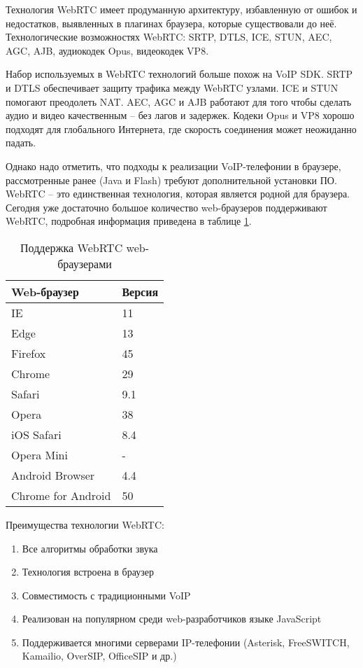 Технология WebRTC имеет продуманную архитектуру, избавленную от ошибок и недостатков, выявленных в плагинах браузера, которые существовали до неё. Технологические возможностях WebRTC: SRTP, DTLS, ICE, STUN, AEC, AGC, AJB, аудиокодек Opus, видеокодек VP8.

Набор используемых в WebRTC технологий больше похож на VoIP SDK. SRTP и DTLS обеспечивает защиту трафика между WebRTC узлами. ICE и STUN помогают преодолеть NAT.\cite{sip_nat} AEC, AGC и AJB работают для того чтобы сделать аудио и видео качественным – без лагов и задержек. Кодеки Opus и VP8 хорошо подходят для глобального Интернета, где скорость соединения может неожиданно падать.

Однако надо отметить, что подходы к реализации VoIP-телефонии в браузере, рассмотренные ранее (Java и Flash) требуют дополнительной установки ПО. WebRTC – это единственная технология, которая является родной для браузера. Сегодня уже достаточно большое количество web-браузеров поддерживают WebRTC, подробная информация приведена в таблице \ref{table:browsers}.\cite{browsers_url}

\begin{table}
    \caption{Поддержка WebRTC web-браузерами}
    \begin{center}
    \begin{tabular}{|l|l|}
    \hline
    \textbf{Web-браузер} & \textbf{Версия}\\
    \hline
    IE & 11 \\
    \hline
    Edge & 13 \\
    \hline
    Firefox & 45 \\
    \hline
    Chrome & 29 \\
    \hline
    Safari & 9.1 \\
    \hline
    Opera & 38 \\
    \hline
    iOS Safari & 8.4 \\
    \hline
    Opera Mini & - \\
    \hline
    Android Browser & 4.4 \\
    \hline
    Chrome for Android & 50 \\
    \hline
    \end{tabular}
    \end{center}
    \label{table:browsers}
\end{table}

Преимущества технологии WebRTC:
\begin{enumerate}
\item Все алгоритмы обработки звука
\item Технология встроена в браузер
\item Совместимость с традиционными VoIP
\item Реализован на популярном среди web-разработчиков языке JavaScript
\item Поддерживается многими серверами IP-телефонии (Asterisk, FreeSWITCH, Kamailio, OverSIP, OfficeSIP и др.)
\end{enumerate}

